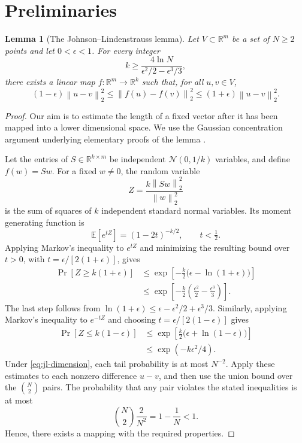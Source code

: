 \documentclass[12pt,letterpaper,oneside]{report}
\newtheorem{lemma}[theorem]{Lemma}
\theoremstyle{definition}
\newcommand{\R}{\mathbb{R}}
\newcommand{\E}{\mathbb{E}}
\newcommand{\norm}[1]{\left\lVert #1\right\rVert}
\begin{document}
\section{Preliminaries}
\begin{lemma}[The Johnson--Lindenstrauss lemma]\label{lem:jl}
Let $V\subset\R^m$ be a set of $N\geq2$ points and let $0<\epsilon<1$.
For every integer
\begin{equation}\label{eq:jl-dimension}
k\geq\frac{4\ln N}{\epsilon^2/2-\epsilon^3/3},
\end{equation}
there exists a linear map $f:\R^m\to\R^k$ such that, for all $u,v\in V$,
\[
(1-\epsilon)\norm{u-v}_2^2
\leq\norm{f(u)-f(v)}_2^2
\leq(1+\epsilon)\norm{u-v}_2^2.
\]
\end{lemma}

\begin{proof}
Our aim is to estimate the length of a fixed vector after it has been
mapped into a lower dimensional space. We use the Gaussian concentration
argument underlying elementary proofs of the lemma
\cite{dasgupta2003,achlioptas2003}.

Let the entries of $S\in\R^{k\times m}$ be independent
$\mathcal{N}(0,1/k)$ variables, and define $f(w)=Sw$. For a fixed
$w\ne0$, the random variable
\[
Z=\frac{k\norm{Sw}_2^2}{\norm{w}_2^2}
\]
is the sum of squares of $k$ independent standard normal variables. Its
moment generating function is
\[
\E[e^{tZ}]=(1-2t)^{-k/2},\qquad t<\tfrac12.
\]
Applying Markov's inequality to $e^{tZ}$ and minimizing the resulting
bound over $t>0$, with $t=\epsilon/[2(1+\epsilon)]$, gives
\begin{align*}
\Pr[Z\geq k(1+\epsilon)]
&\leq\exp\!\left[-\frac{k}{2}
\bigl(\epsilon-\ln(1+\epsilon)\bigr)\right]\\
&\leq\exp\!\left[-\frac{k}{2}
\left(\frac{\epsilon^2}{2}-\frac{\epsilon^3}{3}\right)\right].
\end{align*}
The last step follows from
$\ln(1+\epsilon)\leq\epsilon-\epsilon^2/2+\epsilon^3/3$.
Similarly, applying Markov's inequality to $e^{-tZ}$ and choosing
$t=\epsilon/[2(1-\epsilon)]$ gives
\begin{align*}
\Pr[Z\leq k(1-\epsilon)]
&\leq\exp\!\left[\frac{k}{2}
\bigl(\epsilon+\ln(1-\epsilon)\bigr)\right]\\
&\leq\exp(-k\epsilon^2/4).
\end{align*}
Under \eqref{eq:jl-dimension}, each tail probability is at most $N^{-2}$.
Apply these estimates to each nonzero difference $u-v$, and then use the
union bound over the $\binom{N}{2}$ pairs. The probability that any pair
violates the stated inequalities is at most
\[
\binom{N}{2}\frac{2}{N^2}=1-\frac1N<1.
\]
Hence, there exists a mapping with the required properties.
\end{proof}
\end{document}
